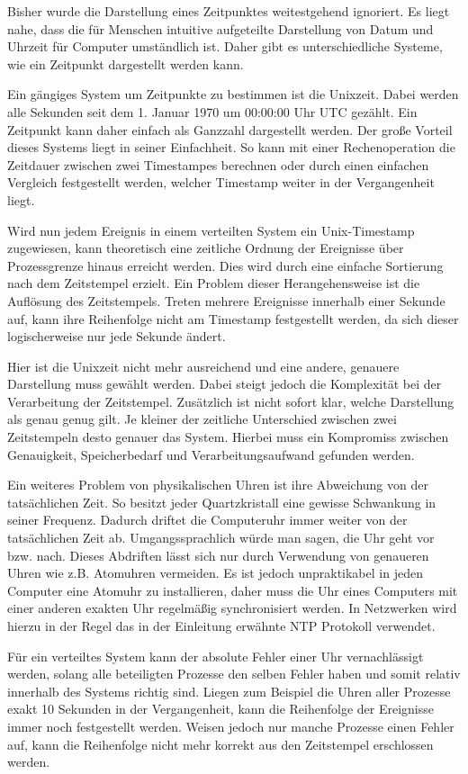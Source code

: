 Bisher wurde die Darstellung eines Zeitpunktes weitestgehend ignoriert. Es liegt nahe, dass die für Menschen intuitive aufgeteilte Darstellung von Datum und Uhrzeit für Computer umständlich ist. Daher gibt es unterschiedliche Systeme, wie ein Zeitpunkt dargestellt werden kann.

Ein gängiges System um Zeitpunkte zu bestimmen ist die Unixzeit.
Dabei werden alle Sekunden seit dem 1. Januar 1970 um 00:00:00 Uhr UTC gezählt.
Ein Zeitpunkt kann daher einfach als Ganzzahl dargestellt werden.
Der große Vorteil dieses Systems liegt in seiner Einfachheit.
So kann mit einer Rechenoperation die Zeitdauer zwischen zwei Timestampes berechnen oder durch einen einfachen Vergleich festgestellt werden, welcher Timestamp weiter in der Vergangenheit liegt.

Wird nun jedem Ereignis in einem verteilten System ein Unix-Timestamp zugewiesen, kann theoretisch eine zeitliche Ordnung der Ereignisse über Prozessgrenze hinaus erreicht werden. Dies wird durch eine einfache Sortierung nach dem Zeitstempel erzielt.
Ein Problem dieser Herangehensweise ist die Auflösung des Zeitstempels. Treten mehrere Ereignisse innerhalb einer Sekunde auf, kann ihre Reihenfolge nicht am Timestamp festgestellt werden, da sich dieser logischerweise nur jede Sekunde ändert.

Hier ist die Unixzeit nicht mehr ausreichend und eine andere, genauere Darstellung muss gewählt werden.
Dabei steigt jedoch die Komplexität bei der Verarbeitung der Zeitstempel.
Zusätzlich ist nicht sofort klar, welche Darstellung als genau genug gilt.
Je kleiner der zeitliche Unterschied zwischen zwei Zeitstempeln desto genauer das System.
Hierbei muss ein Kompromiss zwischen Genauigkeit, Speicherbedarf und Verarbeitungsaufwand gefunden werden.

Ein weiteres Problem von physikalischen Uhren ist ihre Abweichung von der tatsächlichen Zeit.
So besitzt jeder Quartzkristall eine gewisse Schwankung in seiner Frequenz.
Dadurch driftet die Computeruhr immer weiter von der tatsächlichen Zeit ab.
Umgangssprachlich würde man sagen, die Uhr geht vor bzw. nach.
Dieses Abdriften lässt sich nur durch Verwendung von genaueren Uhren wie z.B. Atomuhren vermeiden.
Es ist jedoch unpraktikabel in jeden Computer eine Atomuhr zu installieren, daher muss die Uhr eines Computers mit einer anderen exakten Uhr regelmäßig synchronisiert werden.
In Netzwerken wird hierzu in der Regel das in der Einleitung erwähnte NTP Protokoll verwendet.

Für ein verteiltes System kann der absolute Fehler einer Uhr vernachlässigt werden, solang alle beteiligten Prozesse den selben Fehler haben und somit relativ innerhalb des Systems richtig sind.
Liegen zum Beispiel die Uhren aller Prozesse exakt 10 Sekunden in der Vergangenheit, kann die Reihenfolge der Ereignisse immer noch festgestellt werden. Weisen jedoch nur manche Prozesse einen Fehler auf, kann die Reihenfolge nicht mehr korrekt aus den Zeitstempel erschlossen werden.

